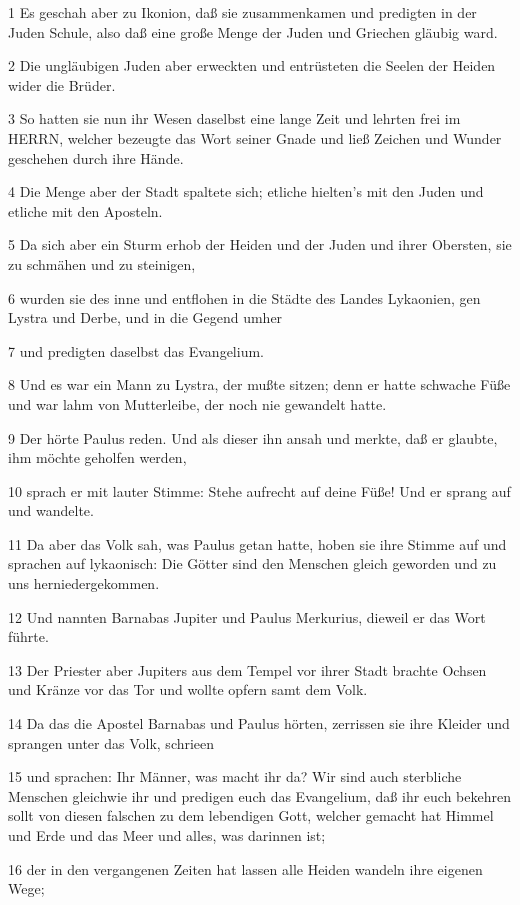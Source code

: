 \par 1 Es geschah aber zu Ikonion, daß sie zusammenkamen und predigten in der Juden Schule, also daß eine große Menge der Juden und Griechen gläubig ward.
\par 2 Die ungläubigen Juden aber erweckten und entrüsteten die Seelen der Heiden wider die Brüder.
\par 3 So hatten sie nun ihr Wesen daselbst eine lange Zeit und lehrten frei im HERRN, welcher bezeugte das Wort seiner Gnade und ließ Zeichen und Wunder geschehen durch ihre Hände.
\par 4 Die Menge aber der Stadt spaltete sich; etliche hielten's mit den Juden und etliche mit den Aposteln.
\par 5 Da sich aber ein Sturm erhob der Heiden und der Juden und ihrer Obersten, sie zu schmähen und zu steinigen,
\par 6 wurden sie des inne und entflohen in die Städte des Landes Lykaonien, gen Lystra und Derbe, und in die Gegend umher
\par 7 und predigten daselbst das Evangelium.
\par 8 Und es war ein Mann zu Lystra, der mußte sitzen; denn er hatte schwache Füße und war lahm von Mutterleibe, der noch nie gewandelt hatte.
\par 9 Der hörte Paulus reden. Und als dieser ihn ansah und merkte, daß er glaubte, ihm möchte geholfen werden,
\par 10 sprach er mit lauter Stimme: Stehe aufrecht auf deine Füße! Und er sprang auf und wandelte.
\par 11 Da aber das Volk sah, was Paulus getan hatte, hoben sie ihre Stimme auf und sprachen auf lykaonisch: Die Götter sind den Menschen gleich geworden und zu uns herniedergekommen.
\par 12 Und nannten Barnabas Jupiter und Paulus Merkurius, dieweil er das Wort führte.
\par 13 Der Priester aber Jupiters aus dem Tempel vor ihrer Stadt brachte Ochsen und Kränze vor das Tor und wollte opfern samt dem Volk.
\par 14 Da das die Apostel Barnabas und Paulus hörten, zerrissen sie ihre Kleider und sprangen unter das Volk, schrieen
\par 15 und sprachen: Ihr Männer, was macht ihr da? Wir sind auch sterbliche Menschen gleichwie ihr und predigen euch das Evangelium, daß ihr euch bekehren sollt von diesen falschen zu dem lebendigen Gott, welcher gemacht hat Himmel und Erde und das Meer und alles, was darinnen ist;
\par 16 der in den vergangenen Zeiten hat lassen alle Heiden wandeln ihre eigenen Wege;
